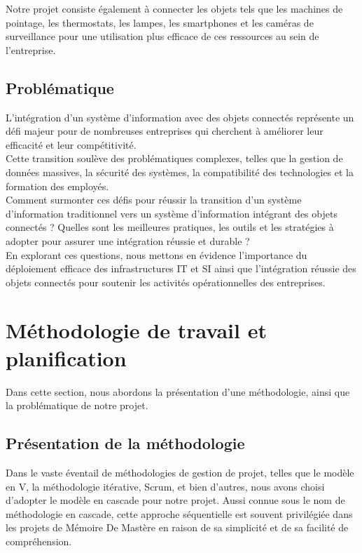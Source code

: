 Notre projet consiste également à connecter les objets tels que les machines de pointage, les thermostats, les lampes, les smartphones et les caméras de surveillance pour une utilisation plus efficace de ces ressources au sein de l'entreprise.\\

\subsection{Problématique}
L'intégration d'un système d'information avec des objets connectés représente un défi majeur pour de nombreuses entreprises qui cherchent à améliorer leur efficacité et leur compétitivité.\\

Cette transition soulève des problématiques complexes, telles que la gestion de données massives, la sécurité des systèmes, la compatibilité des technologies et la formation des employés.\\

Comment surmonter ces défis pour réussir la transition d'un système d'information traditionnel vers un système d'information intégrant des objets connectés ? Quelles sont les meilleures pratiques, les outils et les stratégies à adopter pour assurer une intégration réussie et durable ? \\

En explorant ces questions, nous mettons en évidence l'importance du déploiement efficace des infrastructures IT et SI ainsi que l'intégration réussie des objets connectés pour soutenir les activités opérationnelles des entreprises.



\section{Méthodologie de travail et planification}

Dans cette section, nous abordons la présentation d'une méthodologie, ainsi que la problématique de notre projet.


\subsection{Présentation de la méthodologie}

Dans le vaste éventail de méthodologies de gestion de projet, telles que le modèle en V, la méthodologie itérative, Scrum, et bien d'autres, nous avons choisi d'adopter le modèle en cascade pour notre projet. Aussi connue sous le nom de méthodologie en cascade, cette approche séquentielle est souvent privilégiée dans les projets de Mémoire De Mastère en raison de sa simplicité et de sa facilité de compréhension.

